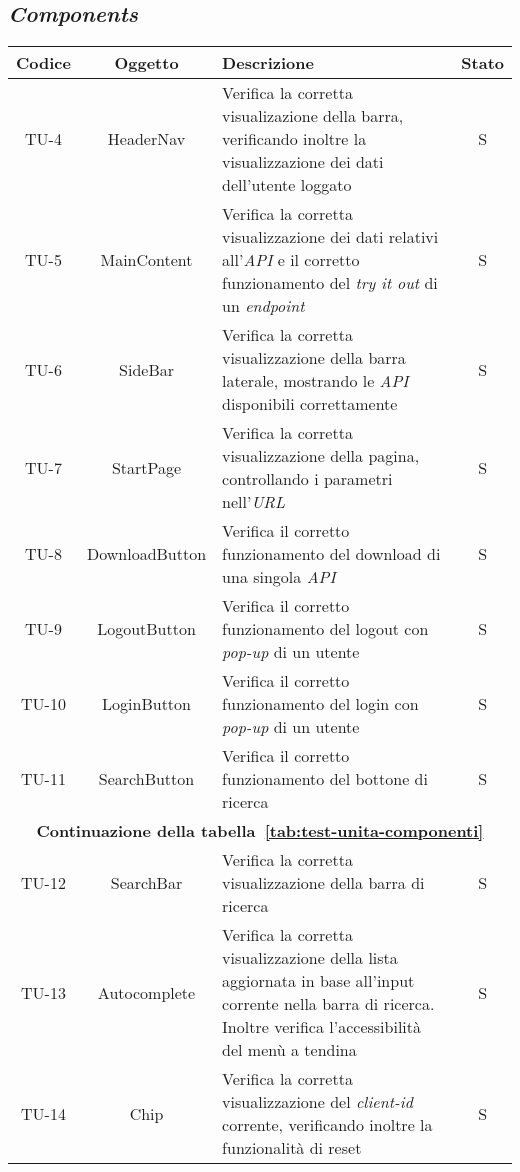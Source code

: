 \subsection*{\emph{Components}}\label{subsec:test-unita-components}

\begin{center}
  \label{tab:test-unita-componenti}
  \begin{longtable}{|c|c|p{}|c|}
  \hline
  \textbf{Codice} & \textbf{Oggetto} & \textbf{Descrizione} & \textbf{Stato}\\
  \hline
  TU-4 &HeaderNav &Verifica la corretta visualizazione della barra, verificando inoltre la visualizzazione dei dati dell'utente loggato  &S \\
  \hline
  TU-5 &MainContent &Verifica la corretta visualizzazione dei dati relativi all'\textit{API} e il corretto funzionamento del \textit{try it out} di un \textit{endpoint} &S \\
  \hline
  TU-6 &SideBar &Verifica la corretta visualizzazione della barra laterale, mostrando le \textit{API} disponibili correttamente &S \\
  \hline
  TU-7 &StartPage &Verifica la corretta visualizzazione della pagina, controllando i parametri nell'\textit{URL} &S \\
  \hline
  TU-8 &DownloadButton &Verifica il corretto funzionamento del download di una singola \textit{API} &S \\
  \hline
  TU-9 &LogoutButton &Verifica il corretto funzionamento del logout con \textit{pop-up} di un utente &S \\
  \hline
  TU-10 &LoginButton &Verifica il corretto funzionamento del login con \textit{pop-up} di un utente &S \\
  \hline
  TU-11 &SearchButton &Verifica il corretto funzionamento del bottone di ricerca &S \\
  \hline
  \multicolumn{4}{|c|}{\textbf{Continuazione della tabella~\ref{tab:test-unita-componenti}}} \\
  \hline
  TU-12 &SearchBar &Verifica la corretta visualizzazione della barra di ricerca &S \\
  \hline
  TU-13 &Autocomplete &Verifica la corretta visualizzazione della lista aggiornata in base all'input corrente nella barra di ricerca. Inoltre verifica l'accessibilità del menù a tendina  &S \\
  \hline
  TU-14 &Chip &Verifica la corretta visualizzazione del \textit{client-id} corrente, verificando inoltre la funzionalità di reset &S \\

\end{longtable}
\end{center}
